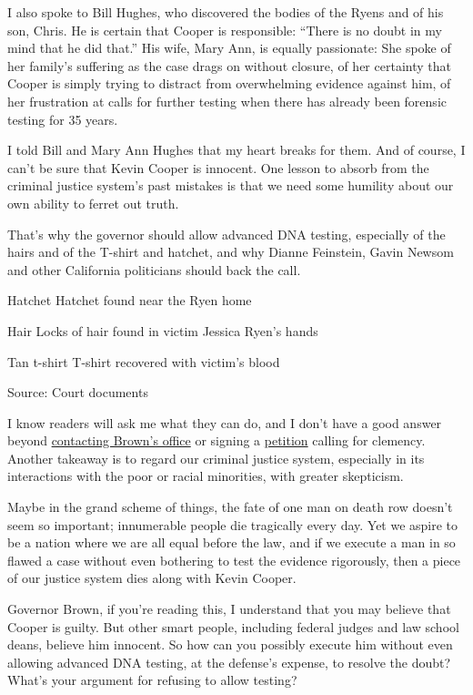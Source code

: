 I also spoke to Bill Hughes, who discovered the bodies of the Ryens and
of his son, Chris. He is certain that Cooper is responsible: ``There is
no doubt in my mind that he did that.'' His wife, Mary Ann, is equally
passionate: She spoke of her family's suffering as the case drags on
without closure, of her certainty that Cooper is simply trying to
distract from overwhelming evidence against him, of her frustration at
calls for further testing when there has already been forensic testing
for 35 years.

I told Bill and Mary Ann Hughes that my heart breaks for them. And of
course, I can't be sure that Kevin Cooper is innocent. One lesson to
absorb from the criminal justice system's past mistakes is that we need
some humility about our own ability to ferret out truth.

That's why the governor should allow advanced DNA testing, especially of
the hairs and of the T-shirt and hatchet, and why Dianne Feinstein,
Gavin Newsom and other California politicians should back the call.

 Hatchet Hatchet found near the Ryen home

 Hair Locks of hair found in victim Jessica Ryen's hands

 Tan t-shirt T-shirt recovered with victim's blood

Source: Court documents

I know readers will ask me what they can do, and I don't have a good
answer beyond \href{https://govapps.gov.ca.gov/gov39mail/}{contacting
Brown's office} or signing a
\href{https://act.amnestyusa.org/ea-action/action?ea.client.id=1839\&ea.campaign.id=40574}{petition}
calling for clemency. Another takeaway is to regard our criminal justice
system, especially in its interactions with the poor or racial
minorities, with greater skepticism.

Maybe in the grand scheme of things, the fate of one man on death row
doesn't seem so important; innumerable people die tragically every day.
Yet we aspire to be a nation where we are all equal before the law, and
if we execute a man in so flawed a case without even bothering to test
the evidence rigorously, then a piece of our justice system dies along
with Kevin Cooper.

Governor Brown, if you're reading this, I understand that you may
believe that Cooper is guilty. But other smart people, including federal
judges and law school deans, believe him innocent. So how can you
possibly execute him without even allowing advanced DNA testing, at the
defense's expense, to resolve the doubt? What's your argument for
refusing to allow testing?


